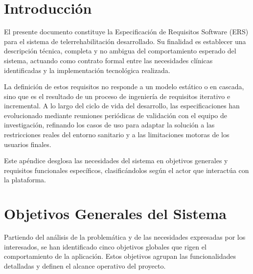 \label{apendice:B}

\section{Introducción}
El presente documento constituye la Especificación de Requisitos Software (ERS) para el sistema de telerrehabilitación desarrollado. Su finalidad es establecer una descripción técnica, completa y no ambigua del comportamiento esperado del sistema, actuando como contrato formal entre las necesidades clínicas identificadas y la implementación tecnológica realizada.

La definición de estos requisitos no responde a un modelo estático o en cascada, sino que es el resultado de un proceso de ingeniería de requisitos iterativo e incremental. A lo largo del ciclo de vida del desarrollo, las especificaciones han evolucionado mediante reuniones periódicas de validación con el equipo de investigación, refinando los casos de uso para adaptar la solución a las restricciones reales del entorno sanitario y a las limitaciones motoras de los usuarios finales.

Este apéndice desglosa las necesidades del sistema en objetivos generales y requisitos funcionales específicos, clasificándolos según el actor que interactúa con la plataforma.

\section{Objetivos Generales del Sistema}
Partiendo del análisis de la problemática y de las necesidades expresadas por los interesados, se han identificado cinco objetivos globales que rigen el comportamiento de la aplicación. Estos objetivos agrupan las funcionalidades detalladas y definen el alcance operativo del proyecto.

